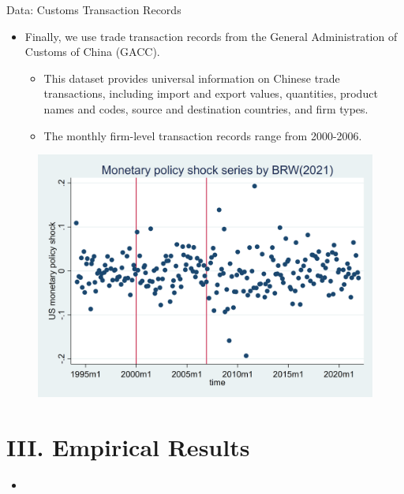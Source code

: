 \documentclass[10pt]{beamer}
\begin{document}
\begin{frame}{Data: Customs Transaction Records}
    \begin{itemize}
	\item Finally, we use trade transaction records from the General Administration of Customs of China (GACC).
	\begin{itemize}
		\item This dataset provides universal information on Chinese trade transactions, including import and export values, quantities, product names and codes, source and destination countries, and firm types.
            \item The monthly firm-level transaction records range from 2000-2006.
	\end{itemize}		
    \end{itemize}
    \begin{figure}[htbp]
	\centering
	\includegraphics[width=0.8\columnwidth]{latex/drafts/pic/BRW.png}
	\label{sum.brw}
    \end{figure}
\end{frame}

\section{III. Empirical Results}

\begin{frame}{}
\begin{itemize}
    \item 
    \medskip

\end{itemize}
\end{frame}

\end{document}
